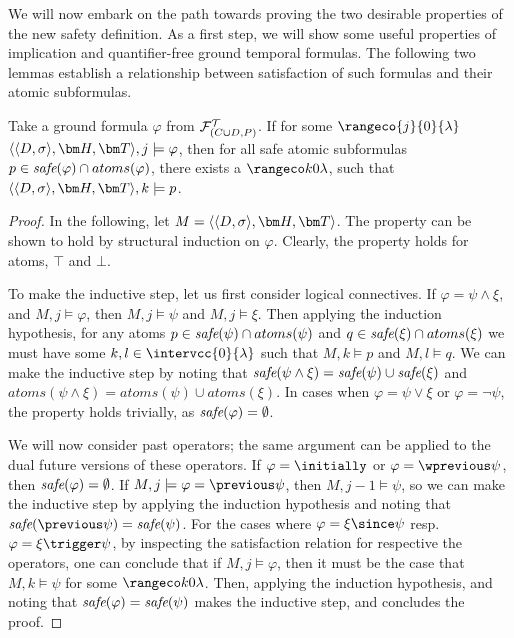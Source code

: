 We will now embark on the path towards proving the two desirable
properties of the new safety definition. As a first step, we will show
some useful properties of implication and quantifier-free ground
temporal formulas. The following two lemmas establish a relationship
between satisfaction of such formulas and their atomic subformulas.

\begin{lemma}\label{lemma:safe-atomic-subformula-satisfied}
  Take a ground formula $\varphi$ from $\mathcal{F}_{(C \cup D,P)}^\mathcal{T}$. If for some
  $\rangeco{j}{0}{\lambda}$\\ $\qthandt,j \models \varphi$, then for
  all safe atomic subformulas
  $p \in \textit{safe}(\varphi) \cap atoms(\varphi)$, there exists a
  $\kinlambda$, such that $\qthandt,k \models p$.
\end{lemma}
\begin{proof}
  In the following, let $M=\qthandt$. The property can be shown to
  hold by structural induction on $\varphi$. Clearly, the property
  holds for atoms, $\top$ and $\bot$.

  To make the inductive step, let us first consider logical
  connectives. If $\varphi = \psi \wedge \xi$, and
  $M,j \models \varphi$, then $M,j \models \psi$ and
  $M,j \models \xi$. Then applying the induction hypothesis, for any
  atoms $p \in \textit{safe}(\psi) \cap atoms(\psi)$ and
  $q \in \textit{safe}(\xi) \cap atoms(\xi)$ we must have some
  $k,l \in \intervcc{0}{\lambda}$ such that $M,k \models p$ and
  $M,l \models q$. We can make the inductive step by noting that
  $\textit{safe}(\psi \wedge \xi) = \textit{safe}(\psi) \cup \textit{safe}(\xi)$ and
  $atoms(\psi \wedge \xi) = atoms(\psi) \cup atoms(\xi)$. In cases
  when $\varphi = \psi \vee \xi$ or $\varphi = \neg \psi$, the
  property holds trivially, as $\textit{safe}(\varphi) = \emptyset$.

  We will now consider past operators; the same argument can be
  applied to the dual future versions of these operators. If
  $\varphi = \initially$ or $\varphi = \wprevious \psi$, then
  $\textit{safe}(\varphi) = \emptyset$. If
  $M,j \models \varphi = \previous \psi$, then $M,j-1 \models \psi$,
  so we can make the inductive step by applying the induction
  hypothesis and noting that
  $\safe{\previous \psi} = \safe{\psi}$. For the cases where
  $\varphi = \xi \since \psi$ resp.  $\varphi = \xi \trigger \psi$, by
  inspecting the satisfaction relation for respective the operators,
  one can conclude that if $M,j \models \varphi$, then it must be the
  case that $M,k \models \psi$ for some $\kinlambda$. Then, applying
  the induction hypothesis, and noting that
  $\textit{safe}(\varphi) = \textit{safe}(\psi)$ makes the inductive step, and
  concludes the proof.

\end{proof}

